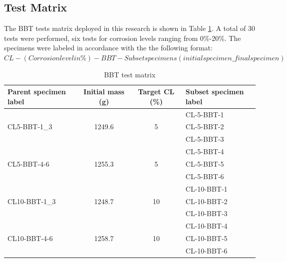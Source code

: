 \subsection{Test Matrix}
The BBT tests matrix deployed in this research is shown in Table \ref{tab:bbt_matrix}. A total of 30 tests were performed, six tests for corrosion levels ranging from 0\%-20\%. The specimens were labeled in accordance with the the following format:
\newline
$CL-(Corrosion level in  \%)-BBT-Subset specimens (initial specimen\_final specimen)$

\begin{table}[htbp]
\caption{BBT test matrix}
\label{tab:bbt_matrix}
\centering
\begin{tabular}{lccl}
Parent specimen label          & Initial mass (g)        & Target CL (\%)      & Subset specimen label \\ \hline
\multirow{3}{*}{CL5-BBT-1\_3}  & \multirow{3}{*}{1249.6} & \multirow{3}{*}{5}  & CL-5-BBT-1            \\
                               &                         &                     & CL-5-BBT-2            \\
                               &                         &                     & CL-5-BBT-3            \\
\multirow{3}{*}{CL5-BBT-4-6}   & \multirow{3}{*}{1255.3} & \multirow{3}{*}{5}  & CL-5-BBT-4            \\
                               &                         &                     & CL-5-BBT-5            \\
                               &                         &                     & CL-5-BBT-6            \\
\multirow{3}{*}{CL10-BBT-1\_3} & \multirow{3}{*}{1248.7} & \multirow{3}{*}{10} & CL-10-BBT-1           \\
                               &                         &                     & CL-10-BBT-2           \\
                               &                         &                     & CL-10-BBT-3           \\
\multirow{3}{*}{CL10-BBT-4-6}  & \multirow{3}{*}{1258.7} & \multirow{3}{*}{10} & CL-10-BBT-4           \\
                               &                         &                     & CL-10-BBT-5           \\
                               &                         &                     & CL-10-BBT-6           \\

\end{tabular}
\end{table}
